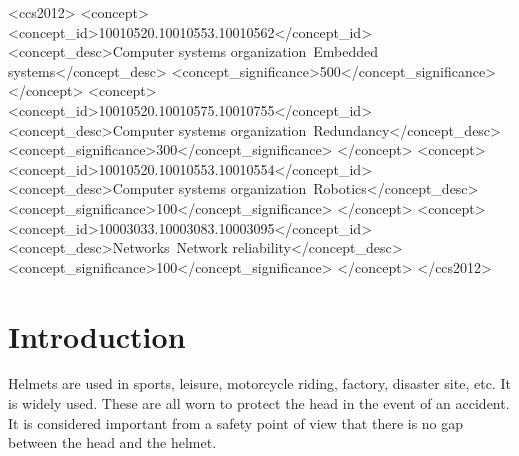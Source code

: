 \documentclass[sigchi,authordraft]{acmart}
\begin{document}
\begin{CCSXML}
<ccs2012>
 <concept>
  <concept_id>10010520.10010553.10010562</concept_id>
  <concept_desc>Computer systems organization~Embedded systems</concept_desc>
  <concept_significance>500</concept_significance>
 </concept>
 <concept>
  <concept_id>10010520.10010575.10010755</concept_id>
  <concept_desc>Computer systems organization~Redundancy</concept_desc>
  <concept_significance>300</concept_significance>
 </concept>
 <concept>
  <concept_id>10010520.10010553.10010554</concept_id>
  <concept_desc>Computer systems organization~Robotics</concept_desc>
  <concept_significance>100</concept_significance>
 </concept>
 <concept>
  <concept_id>10003033.10003083.10003095</concept_id>
  <concept_desc>Networks~Network reliability</concept_desc>
  <concept_significance>100</concept_significance>
 </concept>
</ccs2012>
\end{CCSXML}




\maketitle

\section{Introduction}
\label{sec:introduction}
Helmets are used in sports, leisure, motorcycle riding, factory, disaster site, etc. It is widely used. These are all worn to protect the head in the event of an accident\cite{helmet}. It is considered important from a safety point of view that there is no gap between the head and the helmet.\par
\end{document}
